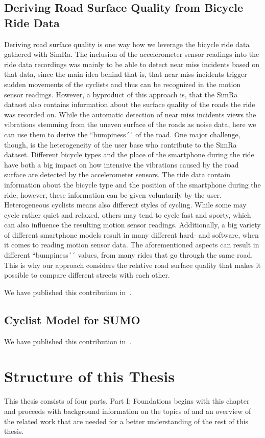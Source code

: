 \subsection{Deriving Road Surface Quality from Bicycle Ride Data}
\label{subsec:road_surface_contribution}
Deriving road surface quality is one way how we leverage the bicycle ride data gathered with SimRa.
The inclusion of the accelerometer sensor readings into the ride data recordings was mainly to be able to detect near miss incidents based on that data, since the main idea behind that is, that near miss incidents trigger sudden movements of the cyclists and thus can be recognized in the motion sensor readings.
However, a byproduct of this approach is, that the SimRa dataset also contains information about the surface quality of the roads the ride was recorded on.
While the automatic detection of near miss incidents views the vibrations stemming from the uneven surface of the roads as noise data, here we can use them to derive the ``bumpiness´´ of the road.
One major challenge, though, is the heterogeneity  of the user base who contribute to the SimRa dataset.
Different bicycle types and the place of the smartphone during the ride have both a big impact on how intensive the vibrations caused by the road surface are detected by the accelerometer sensors.
The ride data contain information about the bicycle type and the position of the smartphone during the ride, however, these information can be given voluntarily by the user.
Heterogeneous cyclists means also different styles of cycling.
While some may cycle rather quiet and relaxed, others may tend to cycle fast and sporty, which can also influence the resulting motion sensor readings.
Additionally, a big variety of different smartphone models result in many different hard- and software, when it comes to reading motion sensor data.
The aforementioned aspects can result in different ``bumpiness´´ values, from many rides that go through the same road.
This is why our approach considers the relative road surface quality that makes it possible to compare different streets with each other.

We have published this contribution in~\cite{karakaya2023crowdsensing}.

\subsection{Cyclist Model for SUMO}
\label{subsec:sumo_contribution}

We have published this contribution in~\cite{karakaya2022realistic,karakaya2023achieving}.

\section{Structure of this Thesis}
\label{sec:structure}

This thesis consists of four parts. Part I: Foundations begins with this chapter and proceeds with background information on the topics of  and an overview of the related work that are needed for a better understanding of the rest of this thesis. 